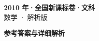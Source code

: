 \documentclass[zihao=-4, a4paper]{ctexart}
\begin{document}
\begin{center}
  {\Large\bfseries 2010 年·全国新课标卷·文科}\\[4pt]
  {\large 数学 · 解析版}
\end{center}
\medskip
{}

\clearpage
{}
\begin{center}{\Large\bfseries 参考答案与详细解析}\end{center}
\medskip

\end{document}
